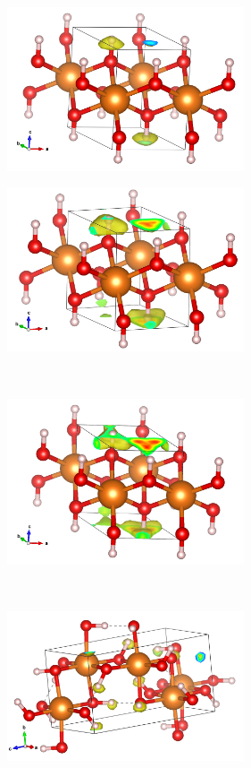 \documentclass[a4paper,12pt]{article}
\begin{document}
\begin{figure}[h!!!!!!!!!!!!!!!!!!!!!]
	\centering
	\begin{subfigure}[t]{0.5\textwidth}
		\centering
		\includegraphics[width=7cm]{figures/p3_p0_t300_Hdist.png}
		\label{Fig10a}
	\end{subfigure}%
	\begin{subfigure}[t]{0.5\textwidth}
		\centering
		\includegraphics[width=7cm]{figures/p3_p100_t1800_Hdist.png}
		\label{Fig10b}
	\end{subfigure}%
	\\
	\begin{subfigure}[t]{0.5\textwidth}
		\centering
		\includegraphics[width=7cm]{figures/p3_p300_t1800_Hdist.png}
		\label{Fig10c}
	\end{subfigure}%
	\\
	\begin{subfigure}[t]{0.5\textwidth}
		\centering
		\includegraphics[width=7cm]{figures/p4_p200_t300_Hdist.png}

\end{subfigure}
\end{figure}
\end{document}
